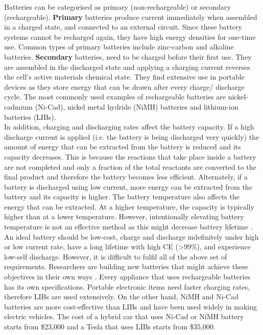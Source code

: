 Batteries can be categorised as primary (non-rechargeable) or secondary (rechargeable). \textbf{Primary} batteries produce current immediately when assembled in a charged state, and connected to an external circuit. Since these battery systems cannot be recharged again, they have high energy densities for one-time use. Common types of primary batteries include zinc-carbon and alkaline batteries. 
\textbf{Secondary} batteries, need to be charged before their first use. They are assembled in the discharged state and applying a charging current reverses the cell's active materials chemical state. They find extensive use in portable devices as they store energy that can be drawn after every charge/ discharge cycle. The most commonly used examples of rechargeable batteries are nickel-cadmium (Ni-Cad), nickel metal hydride (NiMH) batteries and lithium-ion batteries (LIBs). \\  
In addition, charging and discharging rates affect the battery capacity. If a high discharge current is applied (i.e. the battery is being discharged very quickly) the amount of energy that can be extracted from the battery is reduced and its capacity decreases. This is because the reactions that take place inside a battery are not completed and only a fraction of the total reactants are converted to the final product and therefore the battery becomes less efficient. Alternately, if a battery is discharged using low current, more energy can be extracted from the battery and its capacity is higher. The battery temperature also affects the energy that can be extracted. At a higher temperature, the capacity is typically higher than at a lower temperature. However, intentionally elevating battery temperature is not an effective method as this might decrease battery lifetime \cite{leng_effect_2015, ma_temperature_2018}. 
An ideal battery should be low-cost, charge and discharge indefinitely under high or low current rate, have a long lifetime with high CE (>99\%), and experience low-self discharge. However, it is difficult to fulfil all of the above set of requirements. Researchers are building new batteries that might achieve these objectives in their own ways \cite{slater_sodium-ion_2013, jian_carbon_2015, aurbach_prototype_2000, lin_ultrafast_2015}. Every appliance that uses rechargeable batteries has its own specifications. Portable electronic items need faster charging rates, therefore LIBs are used extensively. On the other hand, NiMH and Ni-Cad batteries are more cost-effective than LIBs and have been used widely in making electric vehicles. The cost of a hybrid car that uses Ni-Cad or NiMH battery starts from \$23,000 and a Tesla that uses LIBs starts from \$35,000. \\

